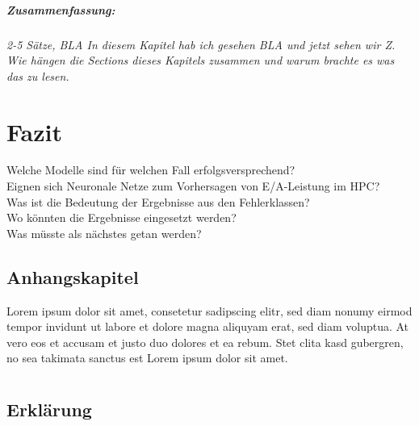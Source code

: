 \documentclass[
	12pt,
	a4paper,
	BCOR10mm,
	DIV14,
	listof=totoc,
	bibliography=totoc,
	headsepline
]{scrreprt}
\begin{document}
\paragraph{Zusammenfassung:}
\textit{2-5 Sätze, BLA In diesem Kapitel hab ich gesehen BLA und jetzt sehen wir Z. Wie hängen die Sections dieses Kapitels zusammen und warum brachte es was das zu lesen.}

\chapter{Fazit}
\label{Fazit}
Welche Modelle sind für welchen Fall erfolgsversprechend?\\
Eignen sich Neuronale Netze zum Vorhersagen von E/A-Leistung im HPC?\\
Was ist die Bedeutung der Ergebnisse aus den Fehlerklassen?\\
Wo könnten die Ergebnisse eingesetzt werden?\\
Was müsste als nächstes getan werden?\\




\listoffigures

\listoftables

\lstlistoflistings

\begin{appendices}

\chapter{Anhangskapitel}

Lorem ipsum dolor sit amet, consetetur sadipscing elitr, sed diam nonumy eirmod tempor invidunt ut labore et dolore magna aliquyam erat, sed diam voluptua.
At vero eos et accusam et justo duo dolores et ea rebum.
Stet clita kasd gubergren, no sea takimata sanctus est Lorem ipsum dolor sit amet.

\end{appendices}

\newpage

\thispagestyle{empty}

\chapter*{}

\section*{Erklärung}
\end{document}
